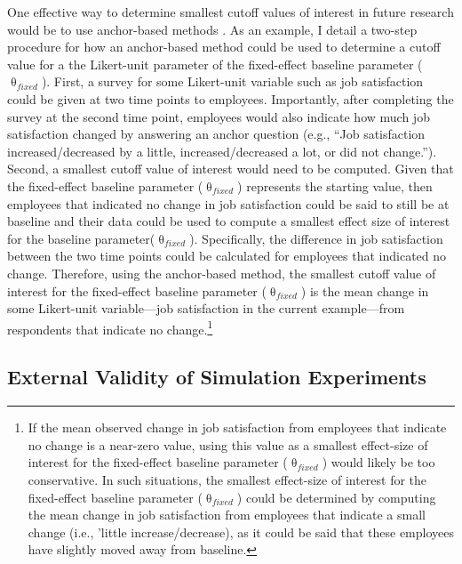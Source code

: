 \documentclass[
12pt, %
twoside,
english]{guelphthesis}
\begin{document}
One effective way to determine smallest cutoff values of interest in future research would be to use anchor-based methods \autocite{anvari2021}. As an example, I detail a two-step procedure for how an anchor-based method could be used to determine a cutoff value for a the Likert-unit parameter of the fixed-effect baseline parameter (\(\uptheta_{fixed}\)). First, a survey for some Likert-unit variable such as job satisfaction could be given at two time points to employees. Importantly, after completing the survey at the second time point, employees would also indicate how much job satisfaction changed by answering an anchor question (e.g., ``Job satisfaction increased/decreased by a little, increased/decreased a lot, or did not change.''). Second, a smallest cutoff value of interest would need to be computed. Given that the fixed-effect baseline parameter (\(\uptheta_{fixed}\)) represents the starting value, then employees that indicated no change in job satisfaction could be said to still be at baseline and their data could be used to compute a smallest effect size of interest for the baseline parameter(\(\uptheta_{fixed}\)). Specifically, the difference in job satisfaction between the two time points could be calculated for employees that indicated no change. Therefore, using the anchor-based method, the smallest cutoff value of interest for the fixed-effect baseline parameter (\(\uptheta_{fixed}\)) is the mean change in some Likert-unit variable---job satisfaction in the current example---from respondents that indicate no change.\footnote{If the mean observed change in job satisfaction from employees that indicate no change is a near-zero value, using this value as a smallest effect-size of interest for the fixed-effect baseline parameter ($\uptheta_{fixed}$) would likely be too conservative. In such situations, the smallest effect-size of interest for the fixed-effect baseline parameter ($\uptheta_{fixed}$) could be determined by computing the mean change in job satisfaction from employees that indicate a small change (i.e., 'little increase/decrease), as it could be said that these employees have slightly moved away from baseline.}

\hypertarget{external-validity-of-simulation-experiments}{%
\subsection{External Validity of Simulation Experiments}\label{external-validity-of-simulation-experiments}}
\end{document}
